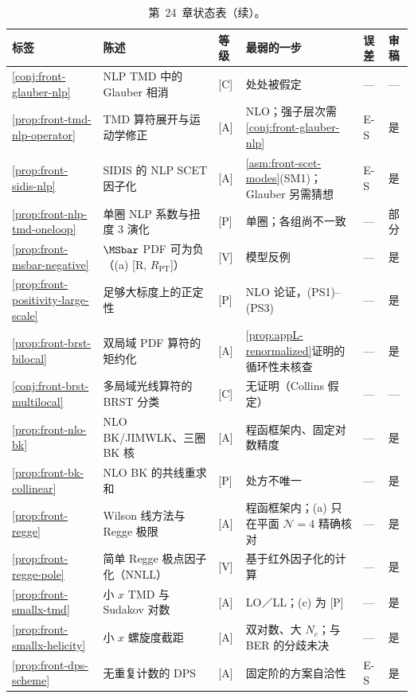 \begin{table}[htbp]
\centering
\caption{第~24~章状态表（续）。}\label{tab:front-status-b}
\footnotesize
\renewcommand{\arraystretch}{1.08}
\begin{tabularx}{\textwidth}{@{}p{1.75cm}>{\raggedright\arraybackslash}Xp{1.35cm}>{\raggedright\arraybackslash}p{3.6cm}p{0.75cm}p{0.95cm}@{}}
\toprule
标签 & 陈述 & 等级 & 最弱的一步 & 误差 & 审稿 \\
\midrule
\cref{conj:front-glauber-nlp} & NLP TMD 中的 Glauber 相消 & [C] & 处处被假定 & — & — \\
\cref{prop:front-tmd-nlp-operator} & TMD 算符展开与运动学修正 & [A] & NLO；强子层次需\cref{conj:front-glauber-nlp} & E-S & 是 \\
\cref{prop:front-sidis-nlp} & SIDIS 的 NLP SCET 因子化 & [A] & \cref{asm:front-scet-modes}(SM1)；Glauber 另需猜想 & E-S & 是 \\
\cref{prop:front-nlp-tmd-oneloop} & 单圈 NLP 系数与扭度 3 演化 & [P] & 单圈；各组尚不一致 & — & 部分 \\
\cref{prop:front-msbar-negative} & $\MSbar$ PDF 可为负（(a) [R, $R_{\mathrm{PT}}$]） & [V] & 模型反例 & — & 是 \\
\cref{prop:front-positivity-large-scale} & 足够大标度上的正定性 & [P] & NLO 论证，(PS1)--(PS3) & — & 是 \\
\cref{prop:front-brst-bilocal} & 双局域 PDF 算符的矩约化 & [A] & \cref{prop:appL-renormalized}证明的循环性未核查 & — & 是 \\
\cref{conj:front-brst-multilocal} & 多局域光线算符的 BRST 分类 & [C] & 无证明（Collins 假定） & — & — \\
\cref{prop:front-nlo-bk} & NLO BK/JIMWLK、三圈 BK 核 & [A] & 程函框架内、固定对数精度 & — & 是 \\
\cref{prop:front-bk-collinear} & NLO BK 的共线重求和 & [P] & 处方不唯一 & — & 是 \\
\cref{prop:front-regge} & Wilson 线方法与 Regge 极限 & [A] & 程函框架内；(a) 只在平面 $\mathcal N=4$ 精确核对 & — & 是 \\
\cref{prop:front-regge-pole} & 简单 Regge 极点因子化（NNLL） & [V] & 基于红外因子化的计算 & — & 是 \\
\cref{prop:front-smallx-tmd} & 小 $x$ TMD 与 Sudakov 对数 & [A] & LO／LL；(c) 为 [P] & — & 是 \\
\cref{prop:front-smallx-helicity} & 小 $x$ 螺旋度截距 & [A] & 双对数、大 $N_c$；与 BER 的分歧未决 & — & 是 \\
\cref{prop:front-dps-scheme} & 无重复计数的 DPS & [A] & 固定阶的方案自洽性 & E-S & 是 \\

\end{tabularx}
\end{table}
